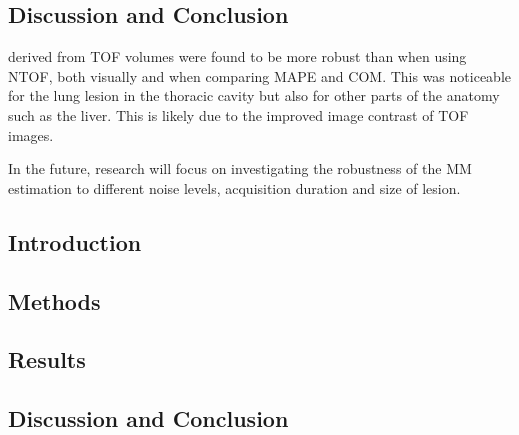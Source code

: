         \subsection{Discussion and Conclusion} \label{sec:impact_of_tof_on_respiratory_motion_model_estimation_using_pre_gated_no_intra_cycle_motion_nac_pet_discussion_and_conclusion}
             derived from  \gls{TOF} volumes were found to be more robust than when using  \gls{NTOF}, both visually and when comparing \gls{MAPE} and \gls{COM}. This was noticeable for the lung lesion in the thoracic cavity but also for other parts of the anatomy such as the liver. This is likely due to the improved image contrast of  \gls{TOF} images.

            In the future, research will focus on investigating the robustness of the \gls{MM} estimation to different noise levels, acquisition duration and size of lesion.
    
        
        
        \subsection{Introduction} \label{sec:extension_of_nac_tof_pet_motion_modelling_to_inter_and_intra_respiratory_cycle_variation_using_respiratory_gating_introduction}
        
        \subsection{Methods} \label{sec:extension_of_nac_tof_pet_motion_modelling_to_inter_and_intra_respiratory_cycle_variation_using_respiratory_gating_methods}
            
            
        \subsection{Results} \label{sec:extension_of_nac_tof_pet_motion_modelling_to_inter_and_intra_respiratory_cycle_variation_using_respiratory_gating_results}
            
            
        \subsection{Discussion and Conclusion} \label{sec:extension_of_nac_tof_pet_motion_modelling_to_inter_and_intra_respiratory_cycle_variation_using_respiratory_gating_discussion_and_conclusion}
            
            